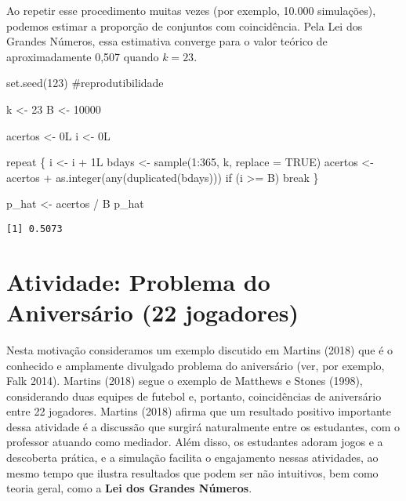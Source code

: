 \documentclass[
  letterpaper,
  DIV=11,
  numbers=noendperiod]{scrreprt}
\newenvironment{Shaded}{\begin{snugshade}}{\end{snugshade}}
\newcommand{\AttributeTok}[1]{\textcolor[rgb]{0.40,0.45,0.13}{#1}}
\newcommand{\CommentTok}[1]{\textcolor[rgb]{0.37,0.37,0.37}{#1}}
\newcommand{\ConstantTok}[1]{\textcolor[rgb]{0.56,0.35,0.01}{#1}}
\newcommand{\ControlFlowTok}[1]{\textcolor[rgb]{0.00,0.23,0.31}{#1}}
\newcommand{\DecValTok}[1]{\textcolor[rgb]{0.68,0.00,0.00}{#1}}
\newcommand{\FunctionTok}[1]{\textcolor[rgb]{0.28,0.35,0.67}{#1}}
\newcommand{\NormalTok}[1]{\textcolor[rgb]{0.00,0.23,0.31}{#1}}
\newcommand{\OtherTok}[1]{\textcolor[rgb]{0.00,0.23,0.31}{#1}}
\newcommand{\SpecialCharTok}[1]{\textcolor[rgb]{0.37,0.37,0.37}{#1}}
\begin{document}
Ao repetir esse procedimento muitas vezes (por exemplo, 10.000
simulações), podemos estimar a proporção de conjuntos com coincidência.
Pela Lei dos Grandes Números, essa estimativa converge para o valor
teórico de aproximadamente 0,507 quando \(k=23\).

\begin{Shaded}
\begin{Highlighting}[]
\FunctionTok{set.seed}\NormalTok{(}\DecValTok{123}\NormalTok{) }\CommentTok{\#reprodutibilidade}

\NormalTok{k }\OtherTok{\textless{}{-}} \DecValTok{23}
\NormalTok{B }\OtherTok{\textless{}{-}} \DecValTok{10000}

\NormalTok{acertos }\OtherTok{\textless{}{-}} \DecValTok{0}\NormalTok{L}
\NormalTok{i }\OtherTok{\textless{}{-}} \DecValTok{0}\NormalTok{L}

\ControlFlowTok{repeat}\NormalTok{ \{}
\NormalTok{  i }\OtherTok{\textless{}{-}}\NormalTok{ i }\SpecialCharTok{+} \DecValTok{1}\NormalTok{L}
\NormalTok{  bdays }\OtherTok{\textless{}{-}} \FunctionTok{sample}\NormalTok{(}\DecValTok{1}\SpecialCharTok{:}\DecValTok{365}\NormalTok{, k, }\AttributeTok{replace =} \ConstantTok{TRUE}\NormalTok{)}
\NormalTok{  acertos }\OtherTok{\textless{}{-}}\NormalTok{ acertos }\SpecialCharTok{+} \FunctionTok{as.integer}\NormalTok{(}\FunctionTok{any}\NormalTok{(}\FunctionTok{duplicated}\NormalTok{(bdays)))}
  \ControlFlowTok{if}\NormalTok{ (i }\SpecialCharTok{\textgreater{}=}\NormalTok{ B) }\ControlFlowTok{break}
\NormalTok{\}}

\NormalTok{p\_hat }\OtherTok{\textless{}{-}}\NormalTok{ acertos }\SpecialCharTok{/}\NormalTok{ B}
\NormalTok{p\_hat}
\end{Highlighting}
\end{Shaded}

\begin{verbatim}
[1] 0.5073
\end{verbatim}

\section{Atividade: Problema do Aniversário (22
jogadores)}\label{atividade-problema-do-aniversuxe1rio-22-jogadores}

Nesta motivação consideramos um exemplo discutido em Martins (2018) que
é o conhecido e amplamente divulgado problema do aniversário (ver, por
exemplo, Falk 2014). Martins (2018) segue o exemplo de Matthews e Stones
(1998), considerando duas equipes de futebol e, portanto, coincidências
de aniversário entre 22 jogadores. Martins (2018) afirma que um
resultado positivo importante dessa atividade é a discussão que surgirá
naturalmente entre os estudantes, com o professor atuando como mediador.
Além disso, os estudantes adoram jogos e a descoberta prática, e a
simulação facilita o engajamento nessas atividades, ao mesmo tempo que
ilustra resultados que podem ser não intuitivos, bem como teoria geral,
como a \textbf{Lei dos Grandes Números}.
\end{document}
